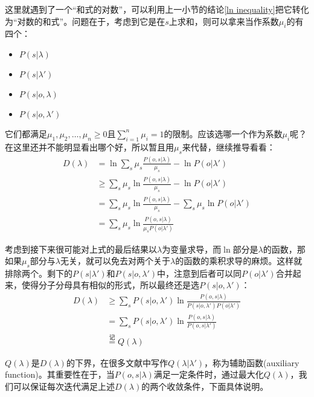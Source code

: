 \documentclass[11pt,a4paper]{article}
\numberwithin{equation}{section}
\begin{document}
这里就遇到了一个“和式的对数”，可以利用上一小节的结论\eqref{ln inequality}把它转化为“对数的和式”。问题在于，考虑到它是在$ s $上求和，则可以拿来当作系数$ \mu_i $的有四个：
\begin{itemize}
\item $ P(s | \lambda) $
\item $ P(s | \lambda') $
\item $ P(s | o, \lambda) $
\item $ P(s | o, \lambda') $
\end{itemize}
它们都满足$ \mu_1, \mu_2, \ldots, \mu_n \ge 0 $且$ \sum_{i = 1}^n \mu_i = 1 $的限制。应该选哪一个作为系数$ \mu_i $呢？在这里还并不能明显看出哪个好，所以暂且用$ \mu_s $来代替，继续推导看看：
\begin{equation}
\begin{split}
D(\lambda)
& = \ln \sum_s \mu_s \frac{P(o, s | \lambda)}{\mu_s} - \ln P(o | \lambda')\\
& \ge \sum_s \mu_s \ln \frac{P(o, s | \lambda)}{\mu_s} - \ln P(o | \lambda')\\
& = \sum_s \mu_s \ln \frac{P(o, s | \lambda)}{\mu_s} - \sum_s \mu_s \ln P(o | \lambda')\\
& = \sum_s \mu_s \ln \frac{P(o, s | \lambda)}{\mu_s P(o | \lambda')}
\end{split}
\end{equation}

考虑到接下来很可能对上式的最后结果以$ \lambda $为变量求导，而$ \ln $部分是$ \lambda $的函数，那如果$ \mu_s $部分与$ \lambda $无关，就可以免去对两个关于$ \lambda $的函数的乘积求导的麻烦。这样就排除两个。剩下的$ P(s | \lambda') $和$ P(s | o, \lambda') $中，注意到后者可以同$ P(o | \lambda') $合并起来，使得分子分母具有相似的形式，所以最终还是选$ P(s | o, \lambda') $：
\begin{equation}
\begin{split}
D(\lambda) 
& \ge \sum_s P(s | o, \lambda') \ln \frac{P(o, s | \lambda)}{P(s | o, \lambda') P(o | \lambda')}\\
& = \sum_s P(s | o, \lambda') \ln \frac{P(o, s | \lambda)}{P(o, s | \lambda')}\\
& \stackrel{\text{记}}{=} Q(\lambda)
\end{split}
\end{equation}

$ Q(\lambda) $是$ D(\lambda) $的下界，在很多文献中写作$ Q(\lambda | \lambda') $，称为辅助函数(auxiliary function)。其重要性在于，当$ P(o, s | \lambda) $满足一定条件时，通过最大化$ Q(\lambda) $，我们可以保证每次迭代满足上述$ D(\lambda) $的两个收敛条件，下面具体说明。
\end{document}
